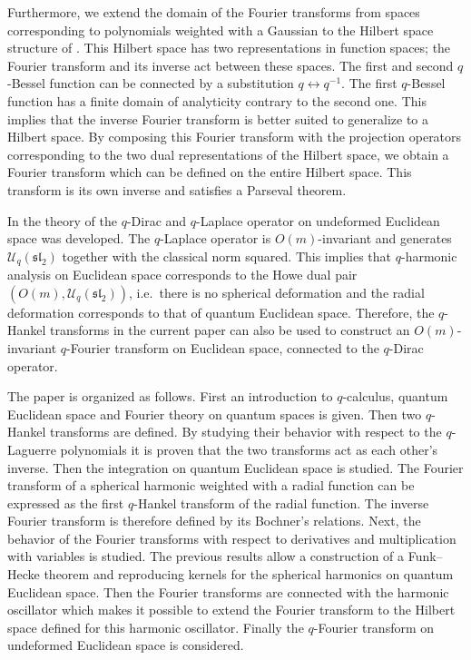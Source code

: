 \documentclass[pdftex]{sigma}
\newcommand{\cU}{\mathcal{U}}
\numberwithin{equation}{section}
\begin{document}
Furthermore, we extend the domain of the Fourier transforms from spaces corresponding to polynomials weighted with a Gaussian to the Hilbert space structure of \cite{MR1239953}. This Hilbert space has two representations in function spaces; the Fourier transform and its inverse act between these spaces. The f\/irst and second $q$-Bessel function can be connected by a substitution $q\leftrightarrow q^{-1}$. The f\/irst $q$-Bessel function has a f\/inite domain of analyticity contrary to the second one. This implies that the inverse Fourier transform is better suited to generalize to a Hilbert space. By composing this Fourier transform with the projection operators corresponding to the two dual representations of the Hilbert space, we obtain a Fourier transform which can be def\/ined on the entire Hilbert space. This transform is its own inverse and satisf\/ies a Parseval theorem.

In \cite{MR2595267} the theory of the $q$-Dirac and $q$-Laplace operator on undeformed Euclidean space was developed. The $q$-Laplace operator is $O(m)$-invariant and generates $\cU_q(\mathfrak{sl}_2)$ together with the classical norm squared. This implies that $q$-harmonic analysis on Euclidean space corresponds to the Howe dual pair $(O(m),\cU_q(\mathfrak{sl}_2))$, i.e.\ there is no spherical deformation and the radial deformation corresponds to that of quantum Euclidean space. Therefore, the $q$-Hankel transforms in the current paper can also be used to construct an $O(m)$-invariant $q$-Fourier transform on Euclidean space, connected to the $q$-Dirac operator.

The paper is organized as follows. First an introduction to $q$-calculus, quantum Euclidean space and Fourier theory on quantum spaces is given. Then two $q$-Hankel transforms are def\/ined. By studying their behavior with respect to the $q$-Laguerre polynomials it is proven that the two transforms act as each other's inverse. Then the integration on quantum Euclidean space is studied. The Fourier transform of a spherical harmonic weighted with a radial function can be expressed as the f\/irst $q$-Hankel transform of the radial function. The inverse Fourier transform is therefore def\/ined by its Bochner's relations. Next, the behavior of the Fourier transforms with respect to derivatives and multiplication with variables is studied. The previous results allow a construction of a Funk--Hecke theorem and reproducing kernels for the spherical harmonics on quantum Euclidean space. Then the Fourier transforms are connected with the harmonic oscillator which makes it possible to extend the Fourier transform to the Hilbert space def\/ined for this harmonic oscillator. Finally the $q$-Fourier transform on undeformed Euclidean space is considered.
\end{document}
